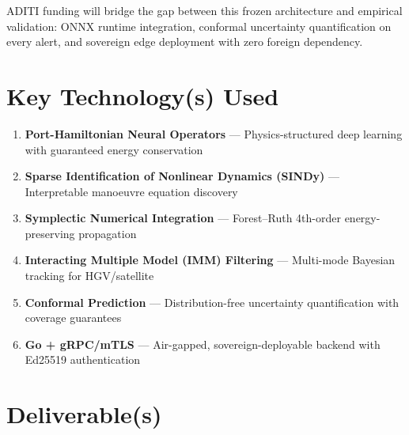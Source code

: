 \documentclass[11pt,a4paper]{article}
\begin{document}
ADITI funding will bridge the gap between this frozen architecture and
empirical validation: ONNX runtime integration, conformal uncertainty
quantification on every alert, and sovereign edge deployment with zero
foreign dependency.

\section{Key Technology(s) Used}

\begin{enumerate}
\item \textbf{Port-Hamiltonian Neural Operators} --- Physics-structured deep learning with guaranteed energy conservation
\item \textbf{Sparse Identification of Nonlinear Dynamics (SINDy)} --- Interpretable manoeuvre equation discovery
\item \textbf{Symplectic Numerical Integration} --- Forest--Ruth 4th-order energy-preserving propagation
\item \textbf{Interacting Multiple Model (IMM) Filtering} --- Multi-mode Bayesian tracking for HGV/satellite
\item \textbf{Conformal Prediction} --- Distribution-free uncertainty quantification with coverage guarantees
\item \textbf{Go + gRPC/mTLS} --- Air-gapped, sovereign-deployable backend with Ed25519 authentication
\end{enumerate}

\section{Deliverable(s)}
\end{document}
